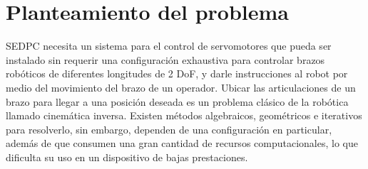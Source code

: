 \section{Planteamiento del problema}

SEDPC necesita un sistema para el control de servomotores que pueda ser instalado sin requerir una configuración exhaustiva para controlar brazos robóticos de diferentes longitudes de 2 DoF, y darle instrucciones al robot por medio del movimiento del brazo de un operador.
\newline\newline\newline
Ubicar las articulaciones de un brazo para llegar a una posición deseada es un problema clásico de la robótica llamado cinemática inversa. Existen métodos algebraicos, geométricos e iterativos para resolverlo, sin embargo, dependen de una configuración en particular, además de que consumen una gran cantidad de recursos computacionales, lo que dificulta su uso en un dispositivo de bajas prestaciones.